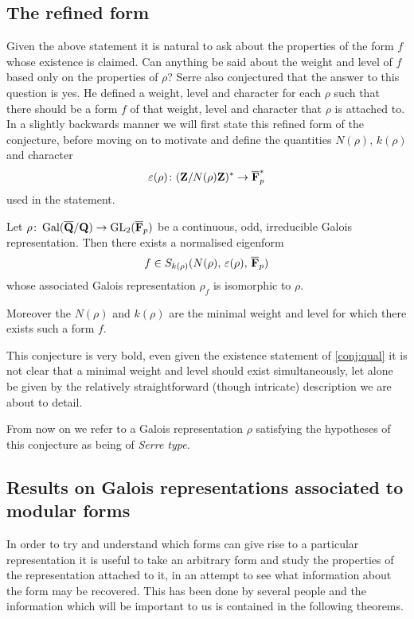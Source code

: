 \documentclass[a4paper,12pt]{article}
\begin{document}
\subsection{The refined form}
Given the above statement it is natural to ask about the properties of the form $f$ whose existence is claimed. %
Can anything be said about the weight and level of $f$ based only on the properties of $\rho$?
Serre also conjectured that the answer to this question is yes.
He defined a weight, level and character for each $\rho$ such that there should be a form $f$ of that weight, level and character that $\rho$ is attached to.
In a slightly backwards manner we will first state this refined form of the conjecture, before moving on to motivate and define the quantities $N(\rho)$, $k(\rho)$ and character
\[
\varepsilon(\rho)\colon (\mathbf{Z}/N(\rho)\mathbf{Z})^* \to \overline{\mathbf{F}}_p^*
\]
used in the statement.

\begin{conjecture}\label{conj:ref}
Let $\rho\colon \operatorname{Gal}(\overline{\mathbf{Q}}/\mathbf{Q}) \to \operatorname{GL}_2(\overline{\mathbf{F}}_p)$ be a continuous, odd, irreducible Galois representation.
Then there exists a normalised eigenform
\[
f\in S_{k(\rho)}(N(\rho),\,\varepsilon(\rho),\,\overline{\mathbf{F}}_p)
\]
whose associated Galois representation $\rho_f$ is isomorphic to $\rho$.

Moreover the $N(\rho)$ and $k(\rho)$ are the minimal weight and level for which there exists such a form $f$.
\end{conjecture}

This conjecture is very bold, even given the existence statement of \cref{conj:qual} it is not clear that a minimal weight and level should exist simultaneously, let alone be given by the relatively straightforward (though intricate) description we are about to detail.

From now on we refer to a Galois representation $\rho$ satisfying the hypotheses of this conjecture as being of \emph{Serre type}.


\subsection{Results on Galois representations associated to modular forms}\label{sec:galassoc}
In order to try and understand which forms can give rise to a particular representation it is useful to take an arbitrary form and study the properties of the representation attached to it, in an attempt to see what information about the form may be recovered.
This has been done by several people and the information which will be important to us is contained in the following theorems. %
\end{document}
